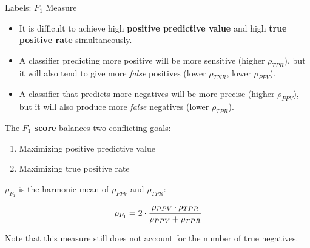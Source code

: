 \documentclass[11pt,compress,t,notes=noshow, xcolor=table]{beamer}
\begin{document}

\begin{vbframe}{Labels: $F_1$ Measure}

\small

\begin{itemize}
  \item It is difficult to achieve high \textbf{positive predictive value} and
  high \textbf{true positive rate} simultaneously.
   \item A classifier predicting more positive will be more
   sensitive (higher $\rho_{TPR}$), but it will also tend to give more
   \textit{false} positives (lower $\rho_{TNR}$, lower $\rho_{PPV}$).
   \item A classifier that predicts more negatives will be more precise
   (higher $\rho_{PPV}$), but it will also produce more \textit{false} negatives
   (lower $\rho_{TPR}$).
 \end{itemize}

The \textbf{$F_1$ score} balances two conflicting goals:\\%
\begin{enumerate}
 \item Maximizing positive predictive value
 \item Maximizing true positive rate \\%
\end{enumerate}

$\rho_{F_1}$ is the harmonic mean of $\rho_{PPV}$ and $\rho_{TPR}$:
$$\rho_{F_1} = 2 \cdot \cfrac{\rho_{PPV} \cdot \rho_{TPR}}{\rho_{PPV} +
\rho_{TPR}}$$

Note that this measure still does not account for the number of true
negatives.

\framebreak

\normalsize


\end{vbframe}
\end{document}
